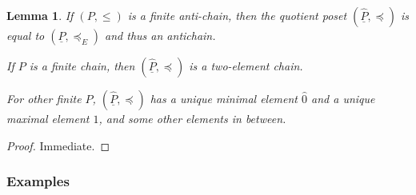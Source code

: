 \documentclass[11pt,a4paper,abstract=yes]{scrartcl}
\theoremstyle{plain}
\newtheorem{lemma}[theorem]{Lemma}
\newcommand{\transerel}{\preceq_{E}}
\newcommand{\Pairs}[1]{\underline{#1}}
\newcommand{\Ppairs}{\Pairs{P}}
\newcommand{\PairsQuotient}[1]{\widehat{\Pairs{#1}}}
\newcommand{\Pqu}{\PairsQuotient{P}}
\newcommand{\pqurel}{\preceq}
\begin{document}
\begin{lemma}
If \((P,\le)\) is a finite  anti-chain, then the quotient poset \((\Pqu, \pqurel)\)
is equal to \((\Ppairs, \transerel)\) and thus an antichain.

If \(P\) is a finite chain, then \((\Pqu, \pqurel)\) is a two-element chain.

For other finite \(P\), \((\Pqu, \pqurel)\) has a unique minimal element \(\hat{0}\) and a unique maximal element \(\hat{1}\), and some other elements in between.
\label{lemma-quotient-poset}
\end{lemma}
\begin{proof}
Immediate.
\end{proof}
\subsubsection{Examples}
\label{sec:org5e69bec}
\end{document}
